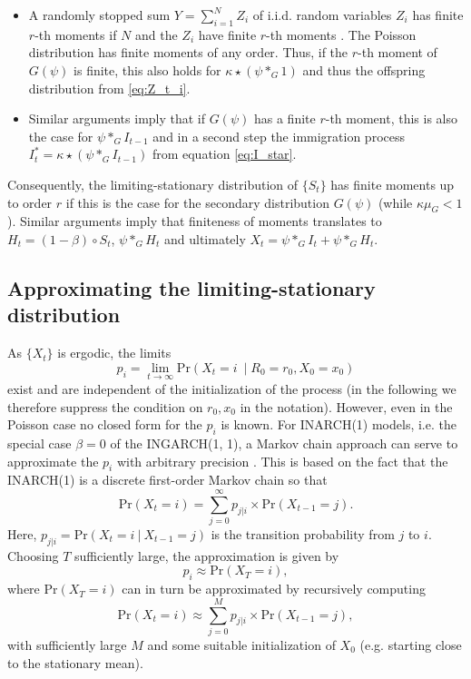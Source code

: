 \documentclass[review]{elsarticle}
\begin{document}
\begin{itemize}
\item A randomly stopped sum $Y = \sum_{i = 1}^N Z_i$ of i.i.d. random variables $Z_i$ has finite $r$-th moments if $N$ and the $Z_i$ have finite $r$-th moments \cite[Theorem 5.2]{Gut2009}. The Poisson distribution has finite moments of any order. Thus, if the $r$-th moment of $G(\psi)$ is finite, this also holds for $\kappa \star (\psi *_G 1)$ and thus the offspring distribution from \eqref{eq:Z_t_i}.
\item Similar arguments imply that if $G(\psi)$ has a finite $r$-th moment, this is also the case for $\psi *_G I_{t - 1}$ and in a second step the immigration process $I^*_t = \kappa \star(\psi *_G I_{t - 1})$ from equation \eqref{eq:I_star}.
\end{itemize}
Consequently, the limiting-stationary distribution of $\{S_t\}$ has finite moments up to order $r$ if this is the case for the secondary distribution $G(\psi)$ (while $\kappa\mu_G < 1$). Similar arguments imply that finiteness of moments translates to $H_t = (1 - \beta) \circ S_t$, $\psi *_G H_t$ and ultimately $X_t = \psi *_G I_t + \psi *_G H_t$.
%
%

\subsection{Approximating the limiting-stationary distribution}

As $\{X_t\}$ is ergodic, the limits %
$$
p_i = \lim_{t \rightarrow \infty} \text{Pr}(X_t = i \ \mid R_0 = r_0, X_0 = x_0)
$$
exist and are independent of the initialization of the process (in the following we therefore suppress the condition on $r_0, x_0$ in the notation). However, even in the Poisson case no closed form for the $p_i$ is known. For INARCH(1) models, i.e. the special case $\beta = 0$ of the INGARCH(1, 1), a Markov chain approach can serve to approximate the $p_i$ with arbitrary precision \cite{Weiss2010}. This is based on the fact that the INARCH(1) is a discrete first-order Markov chain so that
$$
\text{Pr}(X_t = i) = \sum_{j = 0}^\infty p_{j|i} \times \text{Pr}(X_{t - 1} = j).
$$
Here, $p_{j|i} = \text{Pr}(X_t = i \ | \ X_{t - 1} = j) $ is the transition probability from $j$ to $i$. Choosing $T$ sufficiently large, the approximation is given by
$$
p_i \approx \text{Pr}(X_T = i),
$$
where $\text{Pr}(X_T = i)$ can in turn be approximated by recursively computing
$$
\text{Pr}(X_t = i) \approx \sum_{j = 0}^M p_{j|i} \times \text{Pr}(X_{t - 1} = j),
$$
with sufficiently large $M$ and some suitable initialization of $X_0$ (e.g. starting close to the stationary mean).
\end{document}
